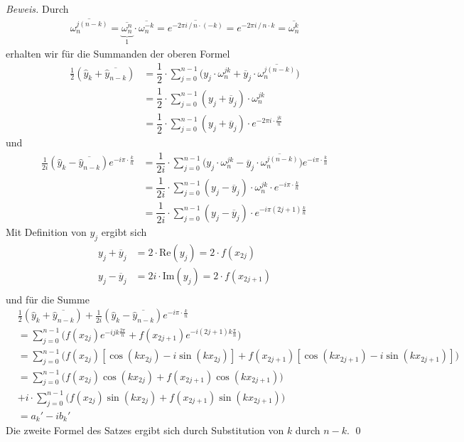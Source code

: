 \textit{Beweis.} 
Durch 
%
\begin{align*}
  \overline{\omega_n^{j(n-k)}} 
  = \overline{\underbrace{\omega_n^{n}}_{1}} \cdot \overline{\omega_n^{-k}} 
  = \overline{e^{-2\pi i \,/\,n\cdot(-k)}}
  = e^{-2\pi i\,/\,n\cdot k}
  = \overline{\omega_n^k} 
\end{align*}
%
erhalten wir für die Summanden der oberen Formel
%
\begin{align*}
  \tfrac{1}{2}(\hat{y}_k + \overline{\hat{y}_{n-k}}) 
  &= \dfrac{1}{2}\cdot\sum_{j=0}^{n-1}
  \Big({y}_j\cdot\omega_n^{jk} + \overline{{y}}_j\cdot\overline{\omega_n^{j(n-k)}}\Big) \\
  &= \dfrac{1}{2}\cdot\sum_{j=0}^{n-1}\left({y}_j+\overline{{y}}_j\right)\cdot\omega_n^{jk}\\
  &= \dfrac{1}{2}\cdot\sum_{j=0}^{n-1}\left({y}_j+\overline{{y}}_j\right)\cdot e^{-2\pi i\cdot\frac{jk}{n}}
\end{align*}
%
und 
%
\begin{align*}
  \tfrac{1}{2i}(\hat{y}_k - \overline{\hat{y}_{n-k}})e^{-i\pi\cdot\tfrac{k}{n}}
  &= \dfrac{1}{2i}\cdot\sum_{j=0}^{n-1}
  \Big({y}_j\cdot\omega_n^{jk} - \overline{{y}}_j\cdot\overline{\omega_n^{j(n-k)}}\Big)
  e^{-i\pi\cdot\tfrac{k}{n}} \\
  &= \dfrac{1}{2i}\cdot\sum_{j=0}^{n-1}
  \left({y}_j-\overline{{y}}_j\right)\cdot\omega_n^{jk}\cdot e^{-i\pi\cdot\tfrac{k}{n}}\\
  &= \dfrac{1}{2i}\cdot\sum_{j=0}^{n-1}
  \left({y}_j-\overline{{y}}_j\right)\cdot e^{-i\pi(2j+1)\tfrac{k}{n}}
\end{align*}
%
Mit Definition von $y_j$ ergibt sich 
%
\begin{align*}
  {y}_j+\overline{{y}}_j &= 2\cdot \mathrm{Re}(y_j) = 2\cdot f(x_{2j}) \\
  {y}_j-\overline{{y}}_j &= 2i\cdot \mathrm{Im}(y_j) = 2\cdot f(x_{2j+1}) \\
\end{align*}
%
und für die Summe
%
\begin{align*}
  &\tfrac{1}{2}(\hat{y}_k + \overline{\hat{y}_{n-k}}) 
  +\tfrac{1}{2i}(\hat{y}_k - \overline{\hat{y}_{n-k}}) e^{-i\pi\cdot\tfrac{k}{n}} \\
  &= \sum_{j=0}^{n-1}\Big(f(x_{2j})e^{-ijk\tfrac{2\pi}{n}}+f(x_{2j+1})e^{-i(2j+1)k\tfrac{\pi}{n}}\Big) \\
  &= \sum_{j=0}^{n-1}\Big(f(x_{2j})\left[\cos(kx_{2j})-i\sin(kx_{2j})\right]
  + f(x_{2j+1})\left[\cos(kx_{2j+1})-i\sin(kx_{2j+1})\right]\Big) \\
  &= \sum_{j=0}^{n-1}\Big(f(x_{2j})\cos(kx_{2j}) + f(x_{2j+1})\cos(kx_{2j+1})\Big)\\
  & + i\cdot\sum_{j=0}^{n-1}\Big(f(x_{2j})\sin(kx_{2j}) + f(x_{2j+1})\sin(kx_{2j+1})\Big) \\
  &= a_k' - ib_k'
\end{align*}
Die zweite Formel des Satzes ergibt sich durch Substitution von $k$ durch $n-k$. 
\qed

